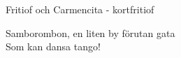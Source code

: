 \begin{song}{Fritiof och Carmencita - kort}{fritiof}
\begin{vers}
Samborombon, en liten by förutan gata\\
Som kan dansa tango!\\
\end{vers}
\end{song}
